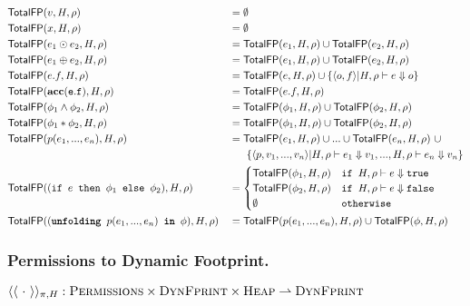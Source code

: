 \documentclass {llncs}
\begin{document}
  \begin{scenter}
        \begin{alignat*}{2}
        	    & \totalFP{H}{\rho}{v}
            &&= \emptyset \\
            & \totalFP{H}{\rho}{x}
            &&= \emptyset \\
            & \totalFP{H}{\rho}{e_1 \odot e_2}
            &&= \totalFP{H}{\rho}{e_1} \cup \totalFP{H}{\rho}{e_2} \\
            & \totalFP{H}{\rho}{e_1 \oplus e_2}
            &&= \totalFP{H}{\rho}{e_1} \cup \totalFP{H}{\rho}{e_2} \\
            & \totalFP{H}{\rho}{e.f}
            &&= \totalFP{H}{\rho}{e} \cup \{ \langle o,f \rangle \vert \evale {e} {o} \} \\
            & \totalFP{H}{\rho}{\phiAcc{e}{f}}
            &&= \totalFP{H}{\rho}{e.f} \\
            & \totalFP{H}{\rho}{\phi_1 \wedge \phi_2}
            &&= \totalFP{H}{\rho}{\phi_1} \cup \totalFP{H}{\rho}{\phi_2} \\
            & \totalFP{H}{\rho}{\phi_1 \ast \phi_2}
            &&= \totalFP{H}{\rho}{\phi_1} \cup \totalFP{H}{\rho}{\phi_2} \\
            & \totalFP{H}{\rho}{p(e_1,...,e_n)}
            &&= \totalFP{H}{\rho}{e_1} \cup ... \cup \totalFP{H}{\rho}{e_n} ~\cup \\
            &&& ~~~~~\{ \langle p, v_1, ..., v_n \rangle \vert \evale {e_1} {v_1}, ..., \evale {e_n} {v_n} \}\\
            & \totalFP{H}{\rho}{\phiCond{e}{\phi_1}{\phi_2}}
            &&= \begin{cases}
            		 \totalFP{H}{\rho}{\phi_1} & \ttt{if } \evale {e} {\phiTrue} \\
            		 \totalFP{H}{\rho}{\phi_2} & \ttt{if } \evale {e} {\phiFalse} \\
            		 \emptyset & \ttt{otherwise}
            		\end{cases} \\
            & \totalFP{H}{\rho}{\unfolding{p(e_1,..., e_n)}{\phi}}
            &&= \totalFP{H}{\rho}{p(e_1, ..., e_n)} \cup \totalFP{H}{\rho}{\phi} \\
        \end{alignat*}
    \end{scenter} 

\subsubsection{Permissions to Dynamic Footprint.}
\noindent $\gerasurePerm{\cdot}: \setDFootprintIso \times \setDFootprintEqui \times \setHeap \rightharpoonup \setDFootprintEqui$
\end{document}
